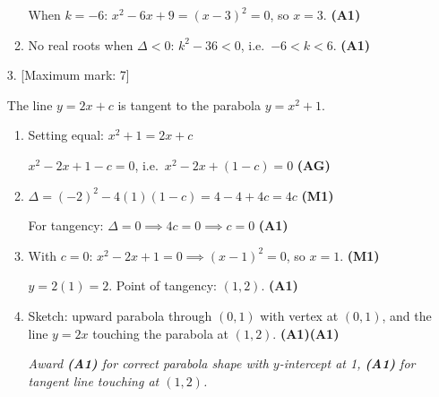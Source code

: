 \documentclass[12pt, twoside]{article}
\begin{document}
\begin{enumerate}[itemsep=0.15cm]
\begin{enumerate}[itemsep=0.3cm]
  When $k = -6$: $x^2 - 6x + 9 = (x - 3)^2 = 0$, so $x = 3$. \hfill \textbf{(A1)}

  \item No real roots when $\Delta < 0$: $k^2 - 36 < 0$, i.e.\ $-6 < k < 6$. \hfill \textbf{(A1)}
\end{enumerate}

\newpage

\item[3.] [Maximum mark: 7]

The line $y = 2x + c$ is tangent to the parabola $y = x^2 + 1$.

\begin{enumerate}[itemsep=0.3cm]
  \item Setting equal: $x^2 + 1 = 2x + c$

  $x^2 - 2x + 1 - c = 0$, i.e.\ $x^2 - 2x + (1 - c) = 0$ \hfill \textbf{(AG)}

  \item $\Delta = (-2)^2 - 4(1)(1 - c) = 4 - 4 + 4c = 4c$ \hfill \textbf{(M1)}

  For tangency: $\Delta = 0 \implies 4c = 0 \implies c = 0$ \hfill \textbf{(A1)}

  \item With $c = 0$: $x^2 - 2x + 1 = 0 \implies (x - 1)^2 = 0$,
  so $x = 1$. \hfill \textbf{(M1)}

  $y = 2(1) = 2$. Point of tangency: $(1, 2)$. \hfill \textbf{(A1)}

  \item Sketch: upward parabola through $(0, 1)$ with vertex at $(0, 1)$,
  and the line $y = 2x$ touching the parabola at $(1, 2)$. \hfill \textbf{(A1)(A1)}

  \textit{Award \textbf{(A1)} for correct parabola shape with $y$-intercept at 1,
  \textbf{(A1)} for tangent line touching at $(1, 2)$.}
\end{enumerate}

\begin{center}
\end{center}


\end{enumerate}
\end{document}
